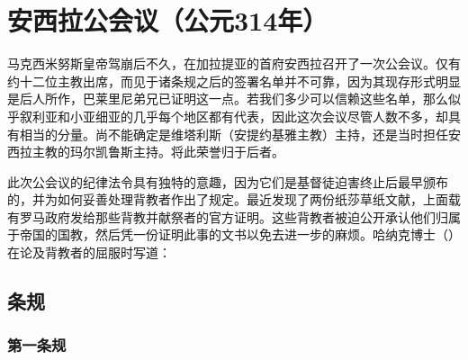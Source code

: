 
\chapter{安西拉公会议（公元314年）}


马克西米努斯皇帝驾崩后不久，在加拉提亚的首府安西拉召开了一次公会议。仅有约十二位主教出席，而见于诸条规之后的签署名单并不可靠，因为其现存形式明显是后人所作，巴莱里尼弟兄已证明这一点。若我们多少可以信赖这些名单，那么似乎叙利亚和小亚细亚的几乎每个地区都有代表，因此这次会议尽管人数不多，却具有相当的分量。尚不能确定是维塔利斯（安提约基雅主教）主持，还是当时担任安西拉主教的玛尔凯鲁斯主持。将此荣誉归于后者。\par

此次公会议的纪律法令具有独特的意趣，因为它们是基督徒迫害终止后最早颁布的，并为如何妥善处理背教者作出了规定。最近发现了两份纸莎草纸文献，上面载有罗马政府发给那些背教并献祭者的官方证明。这些背教者被迫公开承认他们归属于帝国的国教，然后凭一份证明此事的文书以免去进一步的麻烦。哈纳克博士（）在论及背教者的屈服时写道：\par

\par


\section{条规}


\subsection{第一条规}


